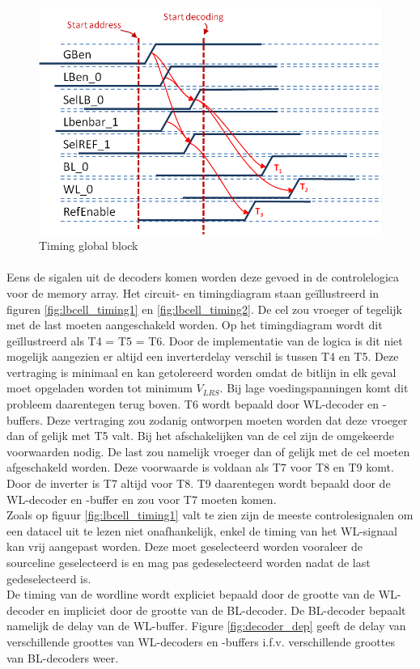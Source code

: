 \begin{figure}[!ht]
  \centering
  \includegraphics[scale=0.9]{../fig/hfdstk-timing-gb2.png}
  \caption[Global block:timing]{Timing global block}
  \label{fig:gb_timing2}
\end{figure}

\paragraph{}
Eens de sigalen uit de decoders komen worden deze gevoed in de controlelogica voor de memory array. Het circuit- en timingdiagram staan geïllustreerd in figuren \ref{fig:lbcell_timing1} en \ref{fig:lbcell_timing2}. De cel zou vroeger of tegelijk met de last moeten aangeschakeld worden. Op het timingdiagram wordt dit geïllustreerd als T4 = T5 = T6. Door de implementatie van de logica is dit niet mogelijk aangezien er altijd een inverterdelay verschil is tussen T4 en T5. Deze vertraging is minimaal en kan getolereerd worden omdat de bitlijn in elk geval moet opgeladen worden tot minimum $V_{LRS}$. Bij lage voedingspanningen komt dit probleem daarentegen terug boven. T6 wordt bepaald door WL-decoder en -buffers. Deze vertraging zou zodanig ontworpen moeten worden dat deze vroeger dan of gelijk met T5 valt. Bij het afschakelijken van de cel zijn de omgekeerde voorwaarden nodig. De last zou namelijk vroeger dan of gelijk met de cel moeten afgeschakeld worden. Deze voorwaarde is voldaan als T7 voor T8 en T9 komt. Door de inverter is T7 altijd voor T8. T9 daarentegen wordt bepaald door de WL-decoder en -buffer en zou voor T7 moeten komen. \\
Zoals op figuur \ref{fig:lbcell_timing1} valt te zien zijn de meeste controlesignalen om een datacel uit te lezen niet onafhankelijk, enkel de timing van het WL-signaal kan vrij aangepast worden. Deze moet geselecteerd worden vooraleer de sourceline geselecteerd is en mag pas gedeselecteerd worden nadat de last gedeselecteerd is. \\
De timing van de wordline wordt expliciet bepaald door de grootte van de WL-decoder en impliciet door de grootte van de BL-decoder. De BL-decoder bepaalt namelijk de delay van de WL-buffer. Figure \ref{fig:decoder_dep} geeft de delay van verschillende groottes van WL-decoders en -buffers i.f.v. verschillende groottes van BL-decoders weer.

